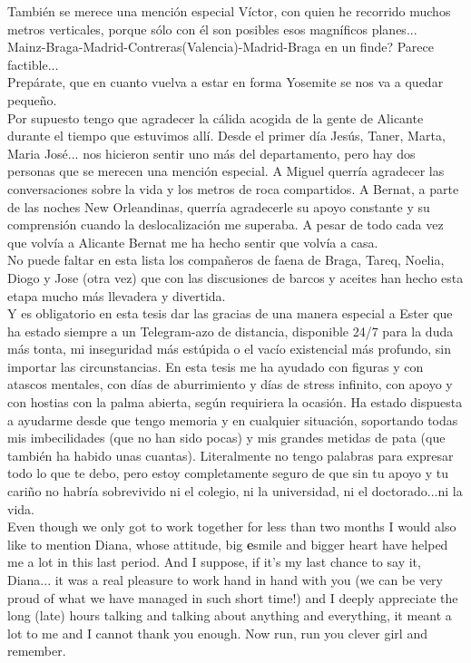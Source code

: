 También se merece una mención especial Víctor, con quien he recorrido muchos metros verticales, porque sólo con él son posibles esos magníficos planes...\\
Mainz-Braga-Madrid-Contreras(Valencia)-Madrid-Braga en un finde? Parece factible...\\
Prepárate, que en cuanto vuelva a estar en forma Yosemite se nos va a quedar pequeño.\\


Por supuesto tengo que agradecer la cálida acogida de la gente de Alicante durante el tiempo que estuvimos allí. Desde el primer día Jesús, Taner, Marta, Maria José... nos hicieron sentir uno más del departamento, pero hay dos personas que se merecen una mención especial. A Miguel querría agradecer las conversaciones sobre la vida y los metros de roca compartidos. A Bernat, a parte de las noches New Orleandinas, querría agradecerle su apoyo constante y su comprensión cuando la deslocalización me superaba. A pesar de todo cada vez que volvía a Alicante Bernat me ha hecho sentir que volvía a casa.\\

No puede faltar en esta lista los compañeros de faena de Braga, Tareq, Noelia, Diogo y Jose (otra vez) que con las discusiones de barcos y aceites han hecho esta etapa mucho más llevadera y divertida.\\


Y es obligatorio en esta tesis dar las gracias de una manera especial a Ester que ha estado siempre a un Telegram-azo de distancia, disponible 24/7 para la duda más tonta, mi inseguridad más estúpida o el vacío existencial más profundo, sin importar las circunstancias. En esta tesis me ha ayudado con figuras y con atascos mentales, con días de aburrimiento y días de stress infinito, con apoyo y con hostias con la palma abierta, según requiriera la ocasión.
Ha estado dispuesta a ayudarme desde que tengo memoria y en cualquier situación, soportando todas mis imbecilidades (que no han sido pocas) y mis grandes metidas de pata (que también ha habido unas cuantas).
Literalmente no tengo palabras para expresar todo lo que te debo, pero estoy completamente seguro de que sin tu apoyo y tu cariño no habría sobrevivido ni el colegio, ni la universidad, ni el doctorado...ni la vida.\\


Even though we only got to work together for less than two months I would also like to mention Diana, whose attitude, big {\bf e}smile and bigger heart have helped me a lot in this last period.
And I suppose, if it's my last chance to say it, Diana... it was a real pleasure to work hand in hand with you (we can be very proud of what we have managed in such short time!) and I deeply appreciate the long (late) hours talking and talking about anything and everything, it meant a lot to me and I cannot thank you enough. Now run, run you clever girl and remember.\\





